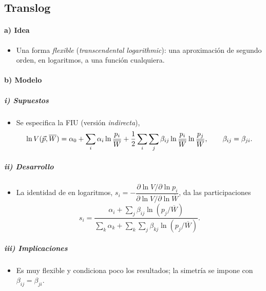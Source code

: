 \documentclass[11pt]{article}
\begin{document}
\subsection{Translog}\label{anexo:translog}

\paragraph{a) Idea}

\begin{itemize}
\item Una forma \emph{flexible} (\emph{transcendental logarithmic}): una aproximación de segundo orden, en logaritmos, a una función cualquiera\nocite{ChristensenJorgensonLau1975Utility}.
\end{itemize}

\paragraph{b) Modelo}

\subparagraph{i) Supuestos}

\begin{itemize}
\item Se especifica la FIU (versión \emph{indirecta}),
  \begin{equation}
  \ln V(\vec{p},\overline{W})=\alpha_0+\sum_i\alpha_i\ln\frac{p_i}{\overline{W}}+\frac12\sum_i\sum_j\beta_{ij}\ln\frac{p_i}{\overline{W}}\ln\frac{p_j}{\overline{W}},\qquad\beta_{ij}=\beta_{ji}. \label{eq:translog}
  \end{equation}
\end{itemize}

\subparagraph{ii) Desarrollo}

\begin{itemize}
\item La identidad de  en logaritmos, $s_i=-\dfrac{\partial\ln V/\partial\ln p_i}{\partial\ln V/\partial\ln\overline{W}}$, da las participaciones
  \begin{equation}
  s_i=\frac{\alpha_i+\sum_j\beta_{ij}\ln(p_j/\overline{W})}{\sum_k\alpha_k+\sum_k\sum_j\beta_{kj}\ln(p_j/\overline{W})}. \label{eq:translog-s}
  \end{equation}
\end{itemize}

\subparagraph{iii) Implicaciones}

\begin{itemize}
\item Es muy flexible y condiciona poco los resultados; la simetría se impone con $\beta_{ij}=\beta_{ji}$.
\end{itemize}
\end{document}
